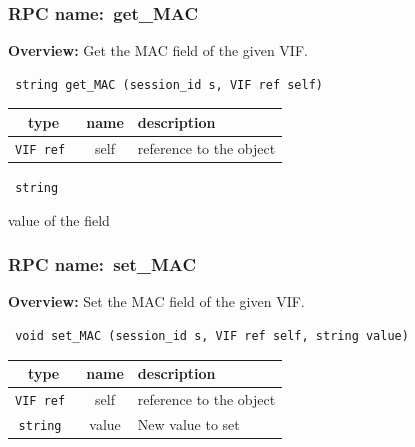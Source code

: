 \vspace{0.3cm}
\vspace{0.3cm}
\vspace{0.3cm}
\subsubsection{RPC name:~get\_MAC}

{\bf Overview:} 
Get the MAC field of the given VIF.

\begin{verbatim} string get_MAC (session_id s, VIF ref self)\end{verbatim}



 
\vspace{0.3cm}
\begin{tabular}{|c|c|p{7cm}|}
 \hline
{\bf type} & {\bf name} & {\bf description} \\ \hline
{\tt VIF ref } & self & reference to the object \\ \hline 

\end{tabular}

\vspace{0.3cm}

{\tt 
string
}


value of the field
\vspace{0.3cm}
\vspace{0.3cm}
\vspace{0.3cm}
\subsubsection{RPC name:~set\_MAC}

{\bf Overview:} 
Set the MAC field of the given VIF.

\begin{verbatim} void set_MAC (session_id s, VIF ref self, string value)\end{verbatim}



 
\vspace{0.3cm}
\begin{tabular}{|c|c|p{7cm}|}
 \hline
{\bf type} & {\bf name} & {\bf description} \\ \hline
{\tt VIF ref } & self & reference to the object \\ \hline 

{\tt string } & value & New value to set \\ \hline 

\end{tabular}

